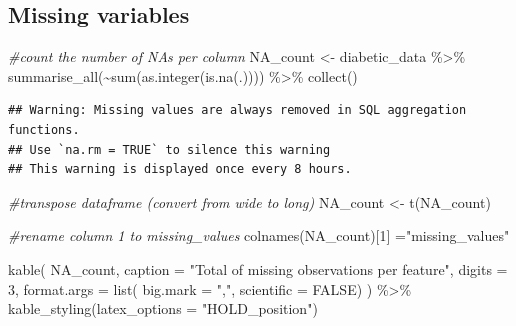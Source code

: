 \documentclass[
]{article}
\newenvironment{Shaded}{\begin{snugshade}}{\end{snugshade}}
\newcommand{\AttributeTok}[1]{\textcolor[rgb]{0.77,0.63,0.00}{#1}}
\newcommand{\CommentTok}[1]{\textcolor[rgb]{0.56,0.35,0.01}{\textit{#1}}}
\newcommand{\ConstantTok}[1]{\textcolor[rgb]{0.00,0.00,0.00}{#1}}
\newcommand{\DecValTok}[1]{\textcolor[rgb]{0.00,0.00,0.81}{#1}}
\newcommand{\FunctionTok}[1]{\textcolor[rgb]{0.00,0.00,0.00}{#1}}
\newcommand{\NormalTok}[1]{#1}
\newcommand{\OtherTok}[1]{\textcolor[rgb]{0.56,0.35,0.01}{#1}}
\newcommand{\SpecialCharTok}[1]{\textcolor[rgb]{0.00,0.00,0.00}{#1}}
\newcommand{\StringTok}[1]{\textcolor[rgb]{0.31,0.60,0.02}{#1}}
\begin{document}
\hypertarget{missing-variables}{%
\subsection{Missing variables}\label{missing-variables}}

\begin{Shaded}
\begin{Highlighting}[]
\CommentTok{\#count the number of  NAs per column}
\NormalTok{NA\_count }\OtherTok{\textless{}{-}}\NormalTok{ diabetic\_data }\SpecialCharTok{\%\textgreater{}\%}
  \FunctionTok{summarise\_all}\NormalTok{(}\SpecialCharTok{\textasciitilde{}}\FunctionTok{sum}\NormalTok{(}\FunctionTok{as.integer}\NormalTok{(}\FunctionTok{is.na}\NormalTok{(.)))) }\SpecialCharTok{\%\textgreater{}\%}
  \FunctionTok{collect}\NormalTok{()}
\end{Highlighting}
\end{Shaded}

\begin{verbatim}
## Warning: Missing values are always removed in SQL aggregation functions.
## Use `na.rm = TRUE` to silence this warning
## This warning is displayed once every 8 hours.
\end{verbatim}

\begin{Shaded}
\begin{Highlighting}[]
\CommentTok{\#transpose dataframe (convert from wide to long)}
\NormalTok{NA\_count }\OtherTok{\textless{}{-}} \FunctionTok{t}\NormalTok{(NA\_count) }

\CommentTok{\#rename column 1 to missing\_values}
\FunctionTok{colnames}\NormalTok{(NA\_count)[}\DecValTok{1}\NormalTok{] }\OtherTok{=}\StringTok{"missing\_values"}

\FunctionTok{kable}\NormalTok{(}
\NormalTok{  NA\_count,}
  \AttributeTok{caption =} \StringTok{"Total of missing observations per feature"}\NormalTok{,}
  \AttributeTok{digits =} \DecValTok{3}\NormalTok{,}
  \AttributeTok{format.args =} \FunctionTok{list}\NormalTok{(}
    \AttributeTok{big.mark =} \StringTok{","}\NormalTok{,}
    \AttributeTok{scientific =} \ConstantTok{FALSE}\NormalTok{)}
\NormalTok{  ) }\SpecialCharTok{\%\textgreater{}\%}
\FunctionTok{kable\_styling}\NormalTok{(}\AttributeTok{latex\_options =} \StringTok{"HOLD\_position"}\NormalTok{)}
\end{Highlighting}
\end{Shaded}
\end{document}
